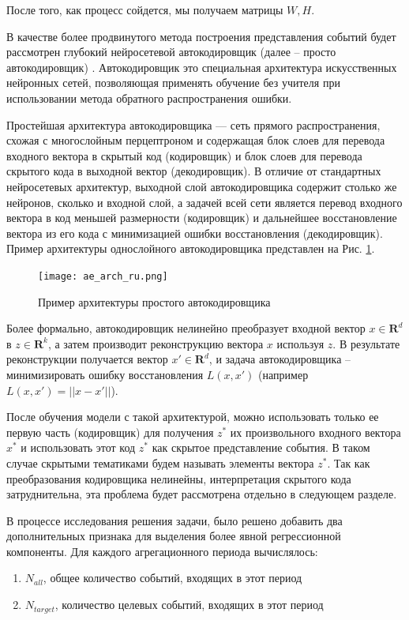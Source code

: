 После того, как процесс сойдется, мы получаем матрицы $W,H$.

В качестве более продвинутого метода построения представления событий будет рассмотрен глубокий нейросетевой автокодировщик (далее -- просто автокодировщик) \cite{ae_orig}. 
Автокодировщик это специальная архитектура искусственных нейронных сетей, позволяющая применять обучение без учителя при использовании метода обратного распространения ошибки.

Простейшая архитектура автокодировщика — сеть прямого распространения, схожая с многослойным перцептроном и содержащая блок слоев для перевода входного вектора в скрытый код (кодировщик) и блок слоев для перевода скрытого кода в выходной вектор (декодировщик). В отличие от стандартных нейросетевых архитектур, выходной слой автокодировщика содержит столько же нейронов, сколько и входной слой, а задачей всей сети является перевод входного вектора в код меньшей размерности (кодировщик) и дальнейшее восстановление вектора из его кода с минимизацией ошибки восстановления (декодировщик). Пример архитектуры однослойного автокодировщика представлен на Рис. \ref{fig:ae_arch}.
\begin{figure}
\centering
  \texttt{[image: ae\_arch\_ru.png]}
  \caption{Пример архитектуры простого автокодировщика}
  \label{fig:ae_arch}
\end{figure}

Более формально, автокодировщик нелинейно преобразует входной вектор $x \in \mathbf{R}^d$ в $z \in \mathbf{R}^k$, а затем производит реконструкцию вектора $x$ используя $z$. В результате реконструкции получается вектор $x' \in \mathbf{R}^d$, и задача автокодировщика -- минимизировать ошибку восстановления $L(x,x')$ (например $L(x,x')=||x - x'||$).

После обучения модели с такой архитектурой, можно использовать только ее первую часть (кодировщик) для получения $z^*$ их произвольного входного вектора $x^*$ и использовать этот код $z^*$ как скрытое представление события. В таком случае скрытыми тематиками будем называть элементы вектора $z^*$.
Так как преобразования кодировщика нелинейны, интерпретация скрытого кода затруднительна, эта проблема будет рассмотрена отдельно в следующем разделе.

В процессе исследования решения задачи, было решено добавить два дополнительных признака для выделения более явной регрессионной компоненты. Для каждого агрегационного периода вычислялось:
\begin{enumerate}
   \item $N_{all}$, общее количество событий, входящих в этот период
   \item $N_{target}$, количество целевых событий, входящих в этот период
\end{enumerate}

